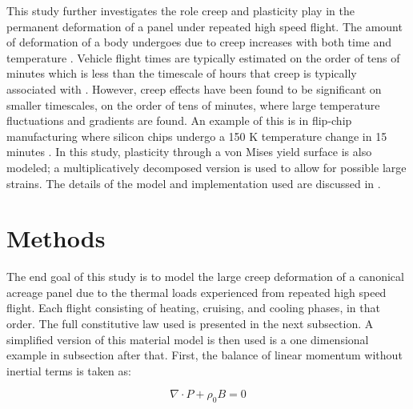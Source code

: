\documentclass[conf]{new-aiaa}
\begin{document}
This study further investigates the role creep and plasticity play 
in the permanent deformation of a panel under repeated high speed flight.
The amount of deformation of a body undergoes due to creep increases 
with both time and temperature
\cite{roylance_mechanics_of_materials_text}. 
Vehicle flight times are typically estimated on the order
of tens of minutes 
\cite{ 
  kordes_structureal_heating_experiencs_on_the_x15_airplane,
  lafontaine_effects_of_strain_hardeing_on_response_of_skin_panels_in_hypersonic_flow,
  zuchowski_AVIATR_Predictive_capability_for_hypersonic_structural_response_and_life_prediction_phase_II}
which is less than the timescale of hours that creep is 
typically associated with 
\cite{ 
  lavina_creep_behavior_of_Ti6Al4V_from_450C_to_600C,
  evans_effects_of_alpha_case_formation_on_creep_fracture_properties_of_the_high_temperature_titanium_alloy_IMI834,
  roylance_mechanics_of_materials_text}.
However, creep effects have been found to be significant on smaller timescales,
on the order of tens of minutes,
where large temperature fluctuations and gradients are found.
An example of this is in flip-chip manufacturing 
where silicon chips undergo a 150 K temperature change 
in 15 minutes
\cite{ 
  li_simulation_of_finite_strain_inelastic_phenomena_governed_by_creep_and_plasticity}.
In this study, plasticity through a von Mises yield surface is also modeled;
a multiplicatively decomposed version is used to allow for 
possible large strains.
The details of the model and implementation used are
discussed in 
\cite{ li_simulation_of_finite_strain_inelastic_phenomena_governed_by_creep_and_plasticity}.

\section{Methods} \label{sec_methods} 

The end goal of this study is to model the large creep deformation of a canonical acreage
panel due to the thermal loads experienced from repeated high speed flight.
Each flight consisting of heating, cruising, and cooling phases, in that order.
The full constitutive law used is presented in the next subsection.
A simplified version of this material model is then used
is a one dimensional example in subsection after that. 
First, the balance of linear momentum without inertial terms is taken as:

\begin{equation}
  \nabla \cdot P + \rho_0 B = 0
\end{equation}
\end{document}
